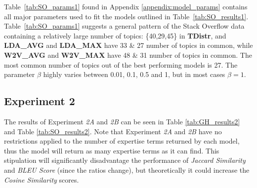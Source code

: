             Table~\ref{tab:SO_params1} found in Appendix \ref{appendix:model_params} contains all major parameters used to fit the models outlined in Table~\ref{tab:SO_results1}. Table~\ref{tab:SO_params1} suggests a general pattern of the Stack Overflow data containing a relatively large number of topics: \{40,29,45\} in  \textbf{TDistr}, and \textbf{LDA\_AVG} and \textbf{LDA\_MAX} have 33 \& 27 number of topics in common, while \textbf{W2V\_AVG} and \textbf{W2V\_MAX} have 48 \& 31 number of topics in common. The most common number of topics out of the best performing models is 27. The parameter $\beta$ highly varies between 0.01, 0.1, 0.5 and 1, but in most cases $\beta=1$.
        
        \subsection{Experiment 2}
            The results of Experiment \emph{2A} and \emph{2B} can be seen in Table \ref{tab:GH_results2} and Table \ref{tab:SO_results2}. Note that Experiment \emph{2A} and \emph{2B} have no restrictions applied to the number of expertise terms returned by each model, thus the model will return as many expertise terms as it can find. This stipulation will significantly disadvantage the performance of \emph{Jaccard Similarity} and \emph{BLEU Score} (since the ratios change), but theoretically it could increase the \emph{Cosine Similarity} scores. 
            
